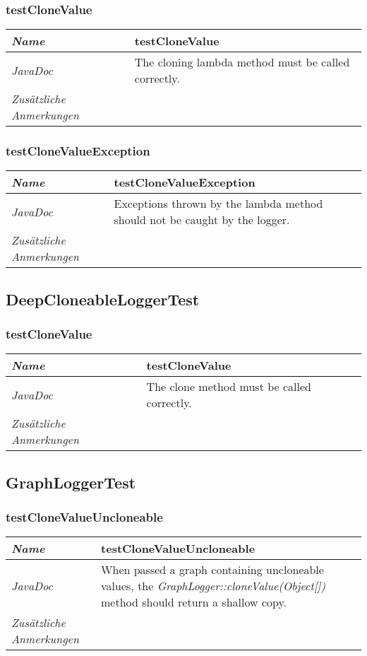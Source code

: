 \documentclass[a4paper]{report}
\begin{document}
\subsubsection{testCloneValue}
\begin{tabular}{p{2.3cm}  p{11.5cm}}
  \hline
 \textit{Name} & testCloneValue\\
  \hline
 \textit{JavaDoc} & The cloning lambda method must be called correctly. \\
  \hline
 \textit{Zusätzliche Anmerkungen} & \\
  \hline
\end{tabular}

\subsubsection{testCloneValueException}
\begin{tabular}{p{2.3cm}  p{11.5cm}}
  \hline
 \textit{Name} & testCloneValueException\\
  \hline
 \textit{JavaDoc} & Exceptions thrown by the lambda method should not be caught by the logger. \\
  \hline
 \textit{Zusätzliche Anmerkungen} & \\
  \hline
\end{tabular}

\subsection{DeepCloneableLoggerTest}

\subsubsection{testCloneValue}
\begin{tabular}{p{2.3cm}  p{11.5cm}}
  \hline
 \textit{Name} & testCloneValue\\
  \hline
 \textit{JavaDoc} & The clone method must be called correctly. \\
  \hline
 \textit{Zusätzliche Anmerkungen} & \\
  \hline
\end{tabular}

\subsection{GraphLoggerTest}

\subsubsection{testCloneValueUncloneable}
\begin{tabular}{p{2.3cm}  p{11.5cm}}
  \hline
 \textit{Name} & testCloneValueUncloneable\\
  \hline
 \textit{JavaDoc} & When passed a graph containing uncloneable values, the \emph{GraphLogger::cloneValue(Object[])} method should return a shallow copy.\\
  \hline
 \textit{Zusätzliche Anmerkungen} & \\
  \hline
\end{tabular}
\end{document}
